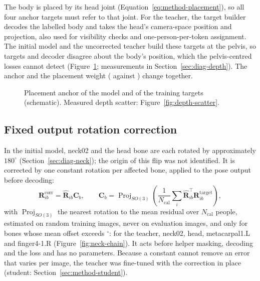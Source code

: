 The body is placed by its head joint (Equation~\eqref{eq:method-placement}), so all four anchor targets must refer to
that joint. For the teacher, the target builder decodes the labelled body and takes
the head's camera-space position and projection, also used for visibility checks and one-person-per-token assignment. The initial model and the uncorrected teacher build these targets at the pelvis, so targets and decoder disagree
about the body's position, which the pelvis-centred losses cannot detect (Figure~\ref{fig:anchor}; measurements in
Section~\ref{sec:diag-depth}). The anchor and the placement weight (\MethodWDist{} against \MethodWDistDefault) change
together.

\begin{figure}[!htb]
\centering

\caption[Consistent supervision of the placement anchor]{Placement anchor of the model and of the training targets
(schematic). Measured depth scatter: Figure~\ref{fig:depth-scatter}.}
\label{fig:anchor}
\end{figure}

\subsection{Fixed output rotation correction}
\label{sec:method-bonefix}

In the initial model, neck02 and the head bone are each rotated by approximately $180^\circ$
(Section~\ref{sec:diag-neck}); the origin of this flip was not identified. It is corrected by one constant rotation
per affected bone, applied to the pose output before decoding:
\begin{equation}
 \mathbf R^{\mathrm{corr}}_{ib}=\widehat{\mathbf R}_{ib}\mathbf C_b,\qquad
 \mathbf C_b=\operatorname{Proj}_{SO(3)}
 \left(\frac{1}{N_{\mathrm{cal}}}\sum_i
 \widehat{\mathbf R}_{ib}^{\top}\mathbf R^{\mathrm{target}}_{ib}\right),
\label{eq:bone-calibration}
\end{equation}
with $\operatorname{Proj}_{SO(3)}$ the nearest rotation to the mean residual over $N_{\mathrm{cal}}$ people, estimated on
\MethodBoneFixImages{} random training images, never on evaluation images, and only for bones whose mean offset
exceeds \MethodBoneFixThr$^\circ$: for the teacher, neck02, head, metacarpal1.L and finger4-1.R
(Figure~\ref{fig:neck-chain}). It acts before helper masking, decoding and the loss and has no parameters. Because a constant cannot remove an error that varies per image, the teacher was fine-tuned with the
correction in place (student: Section~\ref{sec:method-student}).

